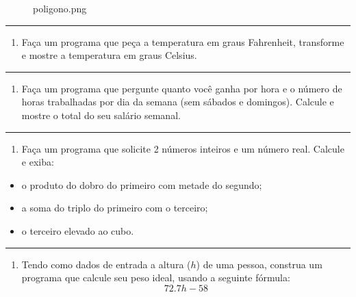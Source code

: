 \documentclass[12pt,a4paper]{article}
\renewcommand{\linethickness}{0.05em}
\providecommand{\tightlist}{%
      \setlength{\itemsep}{0pt}\setlength{\parskip}{0pt}}
\begin{document}
    \begin{figure}
\centering
\caption{poligono.png}
\end{figure}

    \begin{center}\rule{0.5\linewidth}{\linethickness}\end{center}

\begin{enumerate}
\def\labelenumi{\arabic{enumi}.}
\setcounter{enumi}{3}
\tightlist
\item
  Faça um programa que peça a temperatura em graus Fahrenheit,
  transforme e mostre a temperatura em graus Celsius.
\end{enumerate}

    \begin{center}\rule{0.5\linewidth}{\linethickness}\end{center}

\begin{enumerate}
\def\labelenumi{\arabic{enumi}.}
\setcounter{enumi}{2}
\tightlist
\item
  Faça um programa que pergunte quanto você ganha por hora e o número de
  horas trabalhadas por dia da semana (sem sábados e domingos). Calcule
  e mostre o total do seu salário semanal.
\end{enumerate}

    \begin{center}\rule{0.5\linewidth}{\linethickness}\end{center}

\begin{enumerate}
\def\labelenumi{\arabic{enumi}.}
\setcounter{enumi}{4}
\tightlist
\item
  Faça um programa que solicite 2 números inteiros e um número real.
  Calcule e exiba:
\end{enumerate}

\begin{itemize}
\tightlist
\item
  o produto do dobro do primeiro com metade do segundo;
\item
  a soma do triplo do primeiro com o terceiro;
\item
  o terceiro elevado ao cubo.
\end{itemize}

    \begin{center}\rule{0.5\linewidth}{\linethickness}\end{center}

\begin{enumerate}
\def\labelenumi{\arabic{enumi}.}
\setcounter{enumi}{5}
\tightlist
\item
  Tendo como dados de entrada a altura (\(h\)) de uma pessoa, construa
  um programa que calcule seu peso ideal, usando a seguinte fórmula:
  \[72.7h - 58\]
\end{enumerate}
\end{document}
